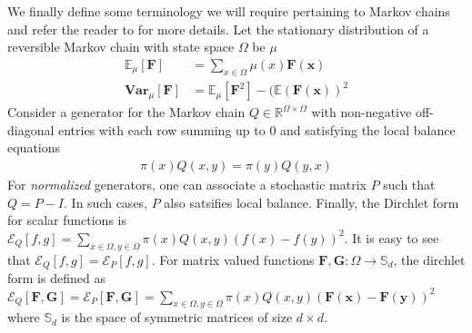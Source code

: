 We finally define some terminology we will require pertaining to Markov chains and refer the reader to \cite{MT06,LPW} for more details.  Let the stationary distribution of a reversible Markov chain with state space $\Omega$ be $\mu$
\begin{align*}
  \mathbb{E}_\mu[\mathbf{F}]&= \sum\limits_{x \in \Omega}\mu(x)\mathbf{F(x)}\\
  \mathbf{Var}_\mu[\mathbf{F}]&=\mathbb{E}_\mu[\mathbf{F}^2]-(\mathbb{E}(\mathbf{F(x)})^2
\end{align*}
Consider a generator for the Markov chain $Q\in\mathbb{R}^{\Omega\times\Omega}$ with non-negative off-diagonal entries with each row summing up to 0 and satisfying the local balance equations
\begin{align*}
  \pi(x)Q(x,y) = \pi(y)Q(y,x)
\end{align*}
For \textit{normalized} generators, one can associate a stochastic matrix $P$ such that $Q=P-I$. In such cases, $P$ also satsifies local balance. Finally, the Dirchlet form for scalar functions is $\mathcal{E}_Q[f,g]=\sum_{x\in\Omega,y\in\Omega}\pi(x)Q(x,y)(f(x)-f(y))^2$. It is easy to see that $\mathcal{E}_Q[f,g]=\mathcal{E}_P[f,g]$. For matrix valued functions $\mathbf{F,G}:\Omega\rightarrow \mathbb{S}_d$, the dirchlet form is defined as $\mathcal{E}_Q[\mathbf{F},\mathbf{G}]=\mathcal{E}_P[\mathbf{F},\mathbf{G}]=\sum_{x\in\Omega,y\in\Omega}\pi(x)Q(x,y)(\mathbf{F(x)}-\mathbf{F(y)})^2$
where $\mathbb{S}_d$ is the space of symmetric matrices of size $d\times d$.

